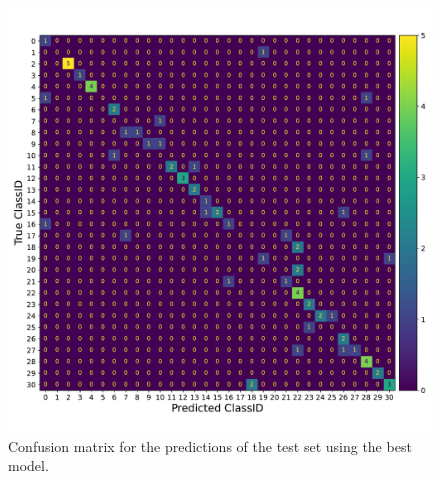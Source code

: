 \begin{figure}[h]
\centering
\captionsetup{width=0.9\linewidth}
\includegraphics[width=1.0\textwidth]{figures/confusion_matrix_best.pdf}
\caption{Confusion matrix for the predictions of the test set using the best model.}
\label{tab:confusion_matrix_best}
\end{figure}
